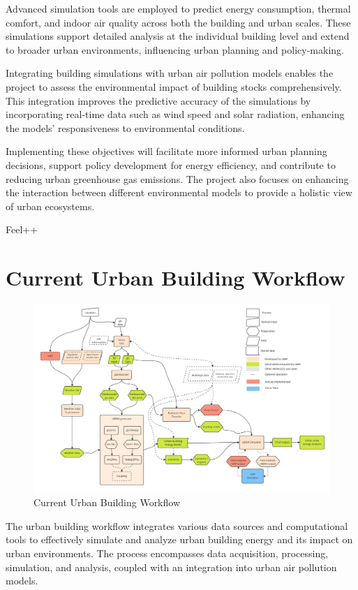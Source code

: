 \documentclass[runningheads]{llncs}
\begin{document}
Advanced simulation tools are employed to predict energy consumption, thermal comfort, and indoor air quality across both the building and urban scales. These simulations support detailed analysis at the individual building level and extend to broader urban environments, influencing urban planning and policy-making.

Integrating building simulations with urban air pollution models enables the project to assess the environmental impact of building stocks comprehensively. This integration improves the predictive accuracy of the simulations by incorporating real-time data such as wind speed and solar radiation, enhancing the models' responsiveness to environmental conditions.

Implementing these objectives will facilitate more informed urban planning decisions, support policy development for energy efficiency, and contribute to reducing urban greenhouse gas emissions. The project also focuses on enhancing the interaction between different environmental models to provide a holistic view of urban ecosystems.

Feel++\cite{christophe_prudhomme_feelppfeelpp_2024}

\section{Current Urban Building Workflow}

\begin{figure}
    \centering
    \includegraphics[width=.9\textwidth]{images/kub-workflow.pdf}
    \caption{Current Urban Building Workflow}
    \label{fig:ub_workflow}
\end{figure}

The urban building workflow integrates various data sources and computational tools to effectively simulate and analyze urban building energy and its impact on urban environments. The process encompasses data acquisition, processing, simulation, and analysis, coupled with an integration into urban air pollution models.
\end{document}
